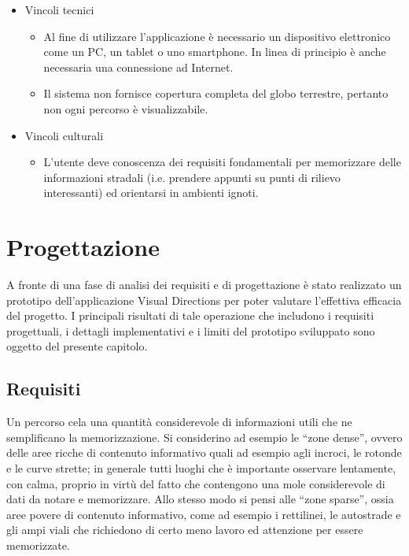 \documentclass[12pt,a4paper,openright, notitlepage]{report}
\begin{document}
\begin{itemize}
	\item Vincoli tecnici
	\begin{itemize}
		\item Al fine di utilizzare l’applicazione è necessario un dispositivo elettronico come un PC, un tablet o uno smartphone. In linea di principio è anche necessaria una connessione ad Internet.
		\item Il sistema non fornisce copertura completa del globo terrestre, pertanto non ogni percorso è visualizzabile.
	\end{itemize}
	\item Vincoli culturali
	\begin{itemize}
		\item L’utente deve conoscenza dei requisiti fondamentali per memorizzare delle informazioni stradali (i.e. prendere appunti su punti di rilievo interessanti) ed orientarsi in ambienti ignoti.
	\end{itemize}
\end{itemize}



\chapter{Progettazione}

A fronte di una fase di analisi dei requisiti e di progettazione è stato realizzato un prototipo  dell’applicazione Visual Directions per poter valutare l’effettiva efficacia del progetto. I principali risultati di tale operazione che includono i requisiti progettuali, i dettagli implementativi e i limiti del prototipo sviluppato sono oggetto del presente capitolo. 

\section{Requisiti}

Un percorso cela una quantità considerevole di informazioni utili che ne semplificano la memorizzazione. Si considerino ad esempio le “zone dense”, ovvero delle aree ricche di contenuto informativo quali ad esempio agli incroci, le rotonde e le curve strette; in generale tutti luoghi che è importante osservare lentamente, con calma, proprio in virtù del fatto che contengono una mole considerevole di dati da notare e memorizzare. Allo stesso modo si pensi alle “zone sparse”, ossia aree povere di contenuto informativo, come ad esempio i rettilinei, le autostrade e gli ampi viali che richiedono di certo meno lavoro ed attenzione per essere memorizzate.
\end{document}
